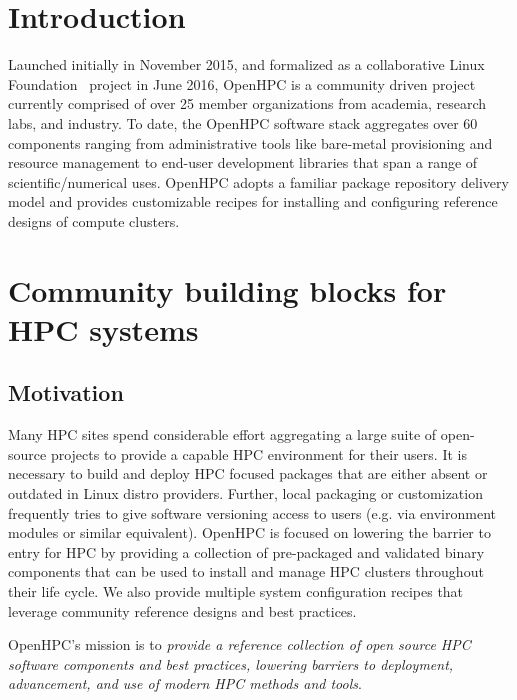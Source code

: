 \documentclass{sig-alternate-05-2015}
\begin{document}
%
%
\printccsdesc



\section{Introduction}
Launched initially in November 2015, and formalized as a collaborative Linux
Foundation~\cite{LinuxFoundation_url} project in June 2016, OpenHPC is a
community driven project currently comprised of over 25 member organizations
from academia, research labs, and industry. To date, the OpenHPC software stack
aggregates over 60 components ranging from administrative tools like bare-metal
provisioning and resource management to end-user development libraries that
span a range of scientific/numerical uses. OpenHPC adopts a familiar package
repository delivery model and provides customizable recipes for installing and
configuring reference designs of compute clusters.

\section{Community building blocks for HPC systems}

\subsection{Motivation}
Many HPC sites spend considerable effort aggregating a large suite of 
open-source projects to provide a capable HPC environment for their users.
It is necessary to build and deploy HPC focused packages that are either absent
or outdated in Linux distro providers. Further, local packaging or 
customization frequently tries to give software versioning access to users (e.g.
via environment modules or similar equivalent). OpenHPC is focused on 
lowering the barrier to entry for HPC by providing a collection of 
pre-packaged and validated binary components that can be used to install 
and manage HPC clusters throughout their life cycle. We also provide multiple 
system configuration recipes that leverage community reference designs and best 
practices.

OpenHPC's mission is to {\em provide a reference collection of open source HPC
software components and best practices, lowering barriers to deployment,
advancement, and use of modern HPC methods and tools}.
\end{document}
